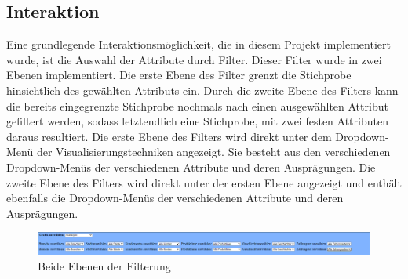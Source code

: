 \documentclass[usegeometry=true]{scrartcl}
\begin{document}
\subsection{Interaktion}
Eine grundlegende Interaktionsmöglichkeit, die in diesem Projekt implementiert wurde, ist die Auswahl der Attribute durch Filter. Dieser Filter wurde in zwei Ebenen implementiert.
Die erste Ebene des Filter grenzt die Stichprobe hinsichtlich des gewählten Attributs ein. Durch die zweite Ebene des Filters kann die bereits eingegrenzte Stichprobe nochmals
nach einen ausgewählten Attribut gefiltert werden, sodass letztendlich eine Stichprobe, mit zwei festen Attributen daraus resultiert. Die erste Ebene des Filters wird direkt
unter dem Dropdown-Menü der Visualisierungstechniken angezeigt. Sie besteht aus den verschiedenen Dropdown-Menüs der verschiedenen Attribute und deren Ausprägungen. Die zweite
Ebene des Filters wird direkt unter der ersten Ebene angezeigt und enthält ebenfalls die Dropdown-Menüs der verschiedenen Attribute und deren Ausprägungen.\\

\begin{figure} [H]
	\begin{center}
		\includegraphics[width=16cm]{IMG/Filterung}
		\caption{Beide Ebenen der Filterung}
		\label{fig:Filterung}
	\end{center}
\end{figure}
\end{document}
